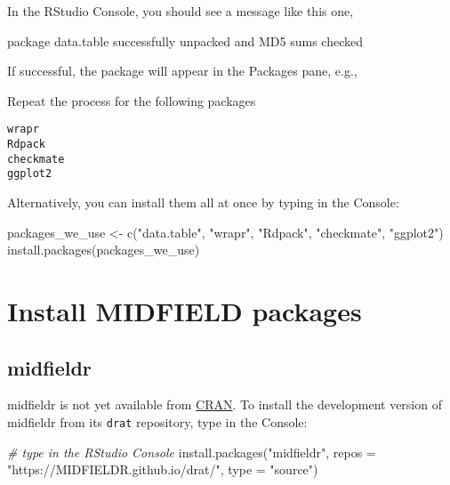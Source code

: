 \documentclass[
]{book}
\newenvironment{Shaded}{\begin{snugshade}}{\end{snugshade}}
\newcommand{\AttributeTok}[1]{\textcolor[rgb]{0.77,0.63,0.00}{#1}}
\newcommand{\CommentTok}[1]{\textcolor[rgb]{0.56,0.35,0.01}{\textit{#1}}}
\newcommand{\FunctionTok}[1]{\textcolor[rgb]{0.00,0.00,0.00}{#1}}
\newcommand{\NormalTok}[1]{#1}
\newcommand{\OtherTok}[1]{\textcolor[rgb]{0.56,0.35,0.01}{#1}}
\newcommand{\StringTok}[1]{\textcolor[rgb]{0.31,0.60,0.02}{#1}}
\begin{document}
In the RStudio Console, you should see a message like this one,

\begin{Shaded}
\begin{Highlighting}[]
\NormalTok{    package }\StringTok{\textquotesingle{}data.table\textquotesingle{}}\NormalTok{ successfully unpacked and MD5 sums checked}
\end{Highlighting}
\end{Shaded}

If successful, the package will appear in the Packages pane, e.g.,

Repeat the process for the following packages

\begin{verbatim}
wrapr 
Rdpack 
checkmate
ggplot2
\end{verbatim}

Alternatively, you can install them all at once by typing in the Console:

\begin{Shaded}
\begin{Highlighting}[]
\NormalTok{packages\_we\_use }\OtherTok{\textless{}{-}} \FunctionTok{c}\NormalTok{(}\StringTok{"data.table"}\NormalTok{, }\StringTok{"wrapr"}\NormalTok{, }\StringTok{"Rdpack"}\NormalTok{, }\StringTok{"checkmate"}\NormalTok{, }\StringTok{"ggplot2"}\NormalTok{)}
\FunctionTok{install.packages}\NormalTok{(packages\_we\_use)}
\end{Highlighting}
\end{Shaded}

\hypertarget{install-midfield-packages}{%
\section{Install MIDFIELD packages}\label{install-midfield-packages}}

\hypertarget{midfieldr}{%
\subsection{midfieldr}\label{midfieldr}}

midfieldr is not yet available from \href{https://cran.r-project.org/}{CRAN}. To install the development version of midfieldr from its \texttt{drat} repository, type in the Console:

\begin{Shaded}
\begin{Highlighting}[]
\CommentTok{\# type in the RStudio Console }
\FunctionTok{install.packages}\NormalTok{(}\StringTok{"midfieldr"}\NormalTok{, }
                 \AttributeTok{repos =} \StringTok{"https://MIDFIELDR.github.io/drat/"}\NormalTok{, }
                 \AttributeTok{type =} \StringTok{"source"}\NormalTok{)}
\end{Highlighting}
\end{Shaded}
\end{document}
